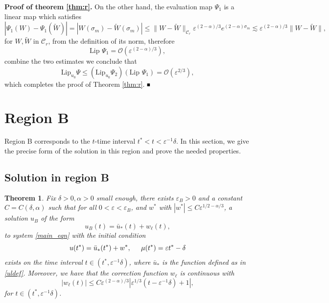 \documentclass[letterpaper,11pt]{article}
\newcommand{\rmO}{\mathcal{O}}
\newcommand{\eps}{\varepsilon}
\newcommand{\lar}{ \lesssim }
\numberwithin{equation}{section}
\theoremstyle{plain}
\newtheorem{theorem}{Theorem}[section]
\newenvironment{Proof}[1][.]%
 {\begin{trivlist}\item[]\textbf{Proof#1 }}%
 {\hspace*{\fill}$\rule{0.3\baselineskip}{0.35\baselineskip}$\end{trivlist}}
\begin{document}
\begin{Proof}[ of theorem \ref{thm:r}.]
On the other hand, the evaluation map $\Psi_1$ is a linear map which satisfies
\[
|\Psi_1(W)-\Psi_1(\widetilde{W})| = |W(\sigma_m) -\widetilde{W}(\sigma_m) | \le\|W - \widetilde{W}\|_{\mathcal{C}_r}\eps^{(2-\alpha)/3} e^{(2-\alpha)\sigma_m} \lar \eps^{(2-\alpha)/3}\|W-\widetilde{W}\|,
\]
for $W,\widetilde{W}$ in $\mathcal{C}_r$, from the definition of its norm, therefore
\[
\text{Lip } \Psi_1 = \rmO(\eps^{(2-\alpha)/3}),
\]
combine the two estimates we conclude that 
\[
\text{Lip}_{u_0} \Psi \le \left( \text{Lip}_{u_0} \Psi_2 \right) \left( \text{Lip } \Psi_1 \right) = \rmO(\eps^{2/3}),
\] 
which completes the proof of Theorem \ref{thm:r}.
\end{Proof}

\section{Region B}\label{sec_B}

Region B corresponds to the $t$-time interval $ t^*< t< \eps^{-1}\delta$. In this section, we give the precise form of the solution in this region and prove the needed properties.

\subsection{Solution in region B}

\begin{theorem}\label{thm:l}
Fix $\delta>0, \alpha>0$ small enough, there exists $\eps_B>0$ and a constant $C=C(\delta,\alpha)$ such that for all $0<\eps <\eps_B$, and $w^*$ with $|w^*| \le  C\eps^{1/2-\alpha/3}$, a solution $u_B$ of the form 
\begin{equation}
u_B(t) = \bar{u}_*(t) + w_\ell(t),
\end{equation}
to system \eqref{main_eqn} with the initial condition
\begin{equation}\label{ul_ic}
u(t^*) = \bar{u}_*(t^*) + w^*, \hspace{0.2in}\mu(t^*) = \eps t^* -\delta
\end{equation}
exists on the time interval $t \in (t^*, \eps^{-1}\delta)$, where $\bar{u}_*$ is the function defined as in \eqref{uldef}. Moreover, we have that the correction function $w_\ell$ is continuous with
\begin{equation}\label{thm:l_1}
|w_\ell(t)| \le C\eps^{(2-\alpha)/3} | \eps^{1/3}(t-\eps^{-1}\delta)+1|,
\end{equation}
for $t \in (t^*, \eps^{-1}\delta)$.
\end{theorem}
\end{document}

